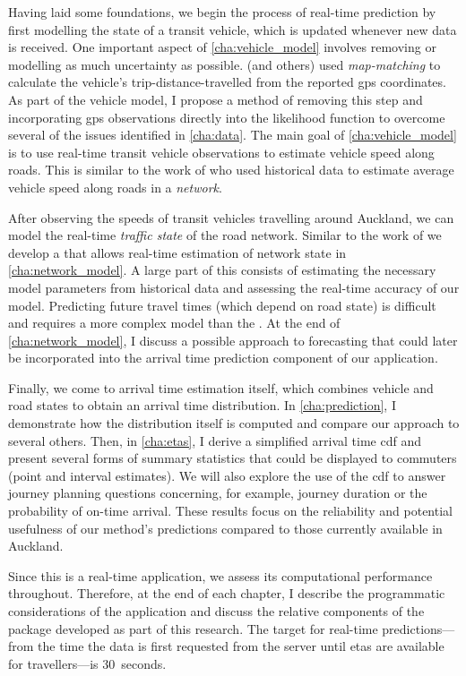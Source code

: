 Having laid some foundations, we begin the process of real-time prediction by first modelling the state of a transit vehicle, which is updated whenever new data is received. One important aspect of \cref{cha:vehicle_model} involves removing or modelling as much uncertainty as possible.  (and others) used \emph{map-matching} to calculate the vehicle's trip-distance-travelled from the reported \gls{gps} coordinates. As part of the vehicle model, I propose a method of removing this step and incorporating \gls{gps} observations directly into the likelihood function to overcome several of the issues identified in \cref{cha:data}. The main goal of \cref{cha:vehicle_model} is to use real-time transit vehicle observations to estimate vehicle speed along roads. This is similar to the work of \citet{Celan_2017,Celan_2018} who used historical data to estimate average vehicle speed along roads in a \emph{network}.


After observing the speeds of transit vehicles travelling around Auckland, we can model the real-time \emph{traffic state} of the road network. Similar to the work of \citet{Shalaby_2004} we develop a \kf{} that allows real-time estimation of network state in \cref{cha:network_model}. A large part of this consists of estimating the necessary model parameters from historical data and assessing the real-time accuracy of our model. Predicting future travel times (which depend on road state) is difficult \citep{He_2020} and requires a more complex model than the \kf{}. At the end of \cref{cha:network_model}, I discuss a possible approach to forecasting that could later be incorporated into the arrival time prediction component of our application.


Finally, we come to arrival time estimation itself, which combines vehicle and road states to obtain an arrival time distribution. In \cref{cha:prediction}, I demonstrate how the distribution itself is computed and compare our approach to several others. Then, in \cref{cha:etas}, I derive a simplified arrival time \gls{cdf} and present several forms of summary statistics that could be displayed to commuters (point and interval estimates).  We will also explore the use of the \gls{cdf} to answer journey planning questions concerning, for example, journey duration or the probability of on-time arrival. These results focus on the reliability and potential usefulness of our method's predictions compared to those currently available in Auckland.


Since this is a real-time application, we assess its computational performance throughout. Therefore, at the end of each chapter, I describe the programmatic considerations of the application and discuss the relative components of the \Rstats{} package  developed as part of this research. The target for real-time predictions---from the time the data is first requested from the server until \glspl{eta} are available for travellers---is 30~seconds.


